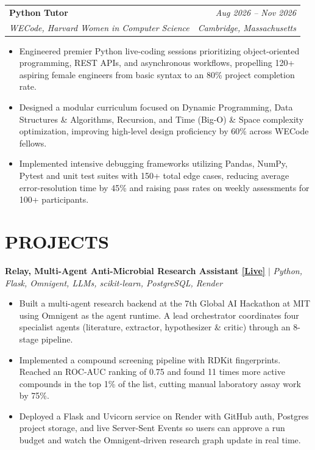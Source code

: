 \documentclass[letterpaper,8pt]{extarticle}
\makeatletter
\newcommand{\ulink}[2]{\href{#1}{\underline{#2}}}
\newcommand{\live}[1]{\ulink{#1}{[Live]}}
\newcommand{\resumeSubheading}[4]{%
  \vspace{2.4pt}%
  \begin{tabular*}{\textwidth}[t]{@{\extracolsep{\fill}}l r@{}}
    \textbf{#1} & \textit{#2} \\[0.7pt]
    \textit{#3} & \textit{#4} \\
  \end{tabular*}%
  \vspace{1.4pt}%
}
\newcommand{\projectHeading}[2]{%
  \vspace{2.4pt}%
  {\raggedright\textbf{#1} $|$ \textit{#2}\par}%
  \vspace{1.4pt}%
}
\makeatother
\begin{document}
\resumeSubheading
  {Python Tutor}{Aug 2026 -- Nov 2026}
  {WECode, Harvard Women in Computer Science}{Cambridge, Massachusetts}
\begin{itemize}
  \item Engineered premier Python live-coding sessions prioritizing object-oriented programming, REST APIs, and asynchronous workflows, propelling 120+ aspiring female engineers from basic syntax to an 80\% project completion rate.
  \item Designed a modular curriculum focused on Dynamic Programming, Data Structures \& Algorithms, Recursion, and Time (Big-O) \& Space complexity optimization, improving high-level design proficiency by 60\% across WECode fellows.
  \item Implemented intensive debugging frameworks utilizing Pandas, NumPy, Pytest and unit test suites with 150+ total edge cases, reducing average error-resolution time by 45\% and raising pass rates on weekly assessments for 100+ participants.
\end{itemize}

\section{PROJECTS}

\projectHeading
  {Relay, Multi-Agent Anti-Microbial Research Assistant \live{https://relay-h0l5.onrender.com/}}
  {Python, Flask, Omnigent, LLMs, scikit-learn, PostgreSQL, Render}
\begin{itemize}
  \item Built a multi-agent research backend at the 7th Global AI Hackathon at MIT using Omnigent as the agent runtime. A lead orchestrator coordinates four specialist agents (literature, extractor, hypothesizer \& critic) through an 8-stage pipeline.
  \item Implemented a compound screening pipeline with RDKit fingerprints. Reached an ROC-AUC ranking of 0.75 and found 11 times more active compounds in the top 1\% of the list, cutting manual laboratory assay work by 75\%.
  \item Deployed a Flask and Uvicorn service on Render with GitHub auth, Postgres project storage, and live Server-Sent Events so users can approve a run budget and watch the Omnigent-driven research graph update in real time.
\end{itemize}
\end{document}
